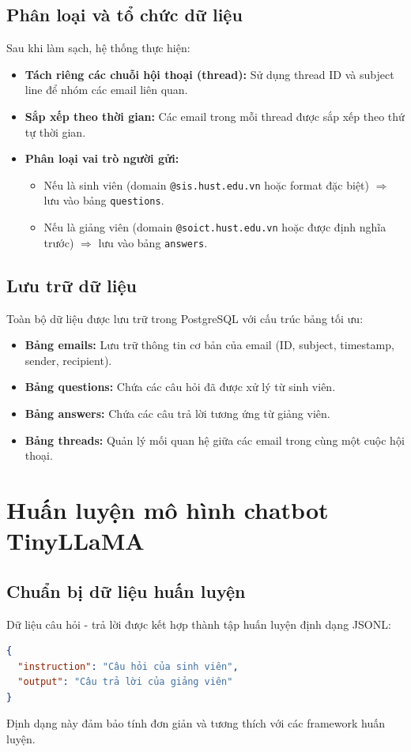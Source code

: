 \documentclass[../DoAn.tex]{subfiles}
\begin{document}
\subsection{Phân loại và tổ chức dữ liệu}
Sau khi làm sạch, hệ thống thực hiện:
\begin{itemize}
    \item \textbf{Tách riêng các chuỗi hội thoại (thread):} Sử dụng thread ID và subject line để nhóm các email liên quan.
    \item \textbf{Sắp xếp theo thời gian:} Các email trong mỗi thread được sắp xếp theo thứ tự thời gian.
    \item \textbf{Phân loại vai trò người gửi:}
    \begin{itemize}
        \item Nếu là sinh viên (domain \texttt{@sis.hust.edu.vn} hoặc format đặc biệt) $\Rightarrow$ lưu vào bảng \texttt{questions}.
        \item Nếu là giảng viên (domain \texttt{@soict.hust.edu.vn} hoặc được định nghĩa trước) $\Rightarrow$ lưu vào bảng \texttt{answers}.
    \end{itemize}
\end{itemize}

\subsection{Lưu trữ dữ liệu}
Toàn bộ dữ liệu được lưu trữ trong PostgreSQL với cấu trúc bảng tối ưu:
\begin{itemize}
    \item \textbf{Bảng emails:} Lưu trữ thông tin cơ bản của email (ID, subject, timestamp, sender, recipient).
    \item \textbf{Bảng questions:} Chứa các câu hỏi đã được xử lý từ sinh viên.
    \item \textbf{Bảng answers:} Chứa các câu trả lời tương ứng từ giảng viên.
    \item \textbf{Bảng threads:} Quản lý mối quan hệ giữa các email trong cùng một cuộc hội thoại.
\end{itemize}

\section{Huấn luyện mô hình chatbot TinyLLaMA}

\subsection{Chuẩn bị dữ liệu huấn luyện}
Dữ liệu câu hỏi - trả lời được kết hợp thành tập huấn luyện định dạng JSONL:
\begin{lstlisting}[language=json,frame=none]
{
  "instruction": "Câu hỏi của sinh viên",
  "output": "Câu trả lời của giảng viên"
}
\end{lstlisting}
Định dạng này đảm bảo tính đơn giản và tương thích với các framework huấn luyện.
\end{document}

